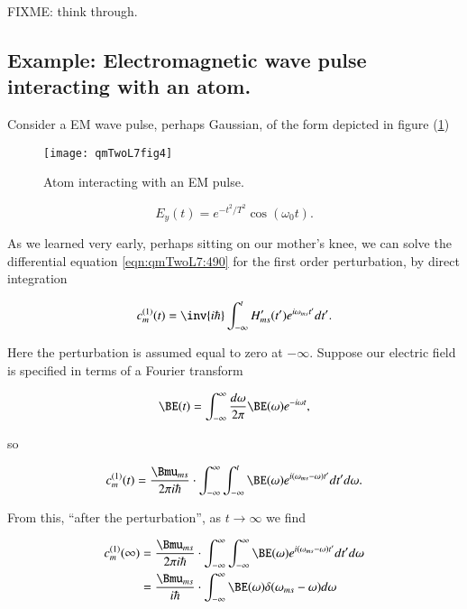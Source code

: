 FIXME: think through.

\subsection{Example: Electromagnetic wave pulse interacting with an atom.}

Consider a EM wave pulse, perhaps Gaussian, of the form depicted in figure (\ref{fig:qmTwoL7:4})

\begin{figure}[htp]
\centering
\texttt{[image: qmTwoL7fig4]}
\caption{Atom interacting with an EM pulse.}\label{fig:qmTwoL7:4}
\end{figure}

\begin{equation}\label{eqn:qmTwoL7:590}
E_y(t) = e^{-t^2/T^2} \cos(\omega_0 t).
\end{equation}

As we learned very early, perhaps sitting on our mother's knee, we can solve the differential equation \ref{eqn:qmTwoL7:490} for the first order perturbation, by direct integration

\begin{equation}\label{eqn:qmTwoL7:510b}
c_m^{(1)}(t) =
\inv{i \hbar} \int_{-\infty}^t
H_{ms}'(t') e^{i \omega_{ms} t'} dt'.
\end{equation}

Here the perturbation is assumed equal to zero at $-\infty$.  Suppose our electric field is specified in terms of a Fourier transform

\begin{equation}\label{eqn:qmTwoL7:530b}
\BE(t) = \int_{-\infty}^\infty \frac{d \omega}{2\pi} \BE(\omega) e^{-i \omega t},
\end{equation}

so

\begin{equation}\label{eqn:qmTwoL7:550b}
c_m^{(1)}(t) =
\frac{\Bmu_{ms}}{2 \pi i \hbar} \cdot
\int_{-\infty}^\infty
\int_{-\infty}^t
\BE(\omega)
e^{i (\omega_{ms} -\omega) t'} dt' d\omega.
\end{equation}

From this, ``after the perturbation'', as $t \rightarrow \infty$ we find

\begin{align*}
c_m^{(1)}(\infty)
&=
\frac{\Bmu_{ms}}{2 \pi i \hbar} \cdot
\int_{-\infty}^\infty
\int_{-\infty}^\infty
\BE(\omega)
e^{i (\omega_{ms} -\omega) t'} dt' d\omega \\
&=
\frac{\Bmu_{ms}}{i \hbar} \cdot
\int_{-\infty}^\infty
\BE(\omega)
\delta(\omega_{ms} - \omega)
d\omega
\end{align*}


